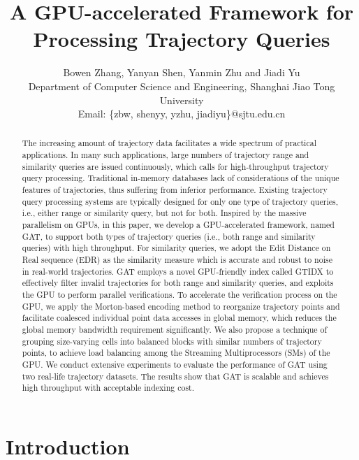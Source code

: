 \documentclass[10pt,conference,letterpaper]{IEEEtran}
\title{A GPU-accelerated Framework for Processing Trajectory Queries}
\author{%
{Bowen Zhang, Yanyan Shen, Yanmin Zhu and Jiadi Yu }\\
Department of Computer Science and Engineering, Shanghai Jiao Tong University\\
Email: \{zbw, shenyy, yzhu, jiadiyu\}@sjtu.edu.cn
}
\begin{document}
\maketitle
%
\begin{abstract}
The increasing amount of trajectory data facilitates a wide spectrum of practical applications. In many such applications, large numbers of trajectory range and similarity queries are issued continuously, which calls for high-throughput trajectory query processing. Traditional in-memory databases lack of considerations of the unique features of trajectories, thus suffering from inferior performance. Existing trajectory query processing systems are typically designed for only one type of trajectory queries, i.e., either range or similarity query,  but not for both.
Inspired by the massive parallelism on GPUs, in this paper, we develop a GPU-accelerated framework, named GAT, to support both types of trajectory queries (i.e., both range and similarity queries) with high throughput.
For similarity queries, we adopt the Edit Distance on Real sequence (EDR) as the similarity measure which is accurate and robust to noise in real-world trajectories.
GAT employs a novel GPU-friendly index called GTIDX to effectively filter invalid trajectories for both range and similarity queries, and exploits the GPU to perform parallel verifications.
To accelerate the verification process on the GPU, we apply the Morton-based encoding method to reorganize trajectory points and facilitate coalesced individual point data accesses in global memory, which reduces the global memory bandwidth requirement significantly. We also propose a technique of grouping size-varying cells into balanced blocks with similar numbers of trajectory points, to achieve load balancing among the Streaming Multiprocessors (SMs) of the GPU.
We conduct extensive experiments to evaluate the performance of GAT using two real-life trajectory datasets. The results show that GAT is scalable and achieves high throughput with acceptable indexing cost.
\end{abstract}

%


\section{Introduction}\label{sec:intro}
\end{document}
